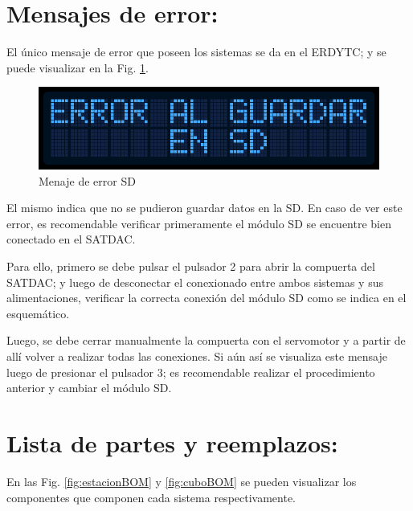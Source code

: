 \documentclass[conference]{IEEEtran}
\begin{document}
\section{Mensajes de error:}
\label{sec:orgcc5377a}
El único mensaje de error que poseen los sistemas se da en el ERDYTC; y se puede visualizar en la Fig. \ref{fig:error}.

\begin{figure}[htbp]
\centering
\includegraphics[width=.9\linewidth]{../../images/error.png}
\caption{\label{fig:error}Menaje de error SD}
\end{figure}

El mismo indica que no se pudieron guardar datos en la SD. En caso de ver este error, es recomendable verificar primeramente el módulo SD se encuentre bien conectado en el SATDAC.

Para ello, primero se debe pulsar el pulsador 2 para abrir la compuerta del SATDAC; y luego de desconectar el conexionado entre ambos sistemas y sus alimentaciones, verificar la correcta conexión del módulo SD como se indica en el esquemático.

Luego, se debe cerrar manualmente la compuerta con el servomotor y a partir de allí volver a realizar todas las conexiones. Si aún así se visualiza este mensaje luego de presionar el pulsador 3; es recomendable realizar el procedimiento anterior y cambiar el módulo SD.
\section{Lista de partes y reemplazos:}
\label{sec:org100c06f}
En las Fig. \ref{fig:estacionBOM} y \ref{fig:cuboBOM} se pueden visualizar los componentes que componen cada sistema respectivamente.
\end{document}

